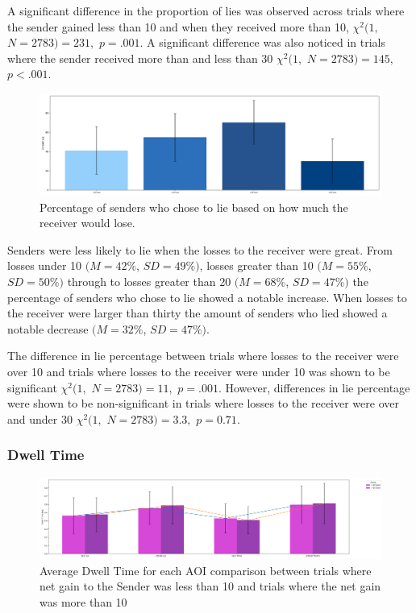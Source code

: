 \documentclass[man, floatsintext]{apa7}
\begin{document}
A significant difference in the proportion of lies was observed across trials where the sender gained less than 10 and when they received more than 10, $\chi^2(1,$ $N=2783) = 231,$ $p=.001$. A significant difference was also noticed in trials where the sender received more than and less than 30 $\chi^2(1,$ $N=2783) = 145,$ $p<.001$.

\begin{figure}[H]
	\includegraphics[width=\linewidth]{../plots/RESPONSE/NetLossLie.png}
	\caption{Percentage of senders who chose to lie based on how much the receiver would lose.}
	\label{fig:NetLossLie}
\end{figure}

Senders were less likely to lie when the losses to the receiver were great. From losses under 10 $(M = 42\%$, $SD = 49\%)$, losses greater than 10 $(M = 55\%$, $SD = 50\%)$ through to losses greater than 20 $(M = 68\%$, $SD = 47\%)$ the percentage of senders who chose to lie showed a notable increase. When losses to the receiver were larger than thirty the amount of senders who lied showed a notable decrease $(M = 32\%$, $SD = 47\%)$. 

The difference in lie percentage between trials where losses to the receiver were over 10 and trials where losses to the receiver were under 10 was shown to be significant $\chi^2(1,$ $N=2783) = 11,$ $p=.001$. However, differences in lie percentage were shown to be non-significant in trials where losses to the receiver were over and under 30 $\chi^2(1,$ $N=2783) = 3.3,$ $p=0.71$.

\subsubsection{Dwell Time}

\begin{figure}[H]
	\includegraphics[width=\linewidth]{../plots/RESPONSE/AvgDwellPerGain.png}
	\caption{Average Dwell Time for each AOI comparison between trials where net gain to the Sender was less than 10 and trials where the net gain was more than 10}
	\label{fig:AvgDwellPerGain}
\end{figure}
\end{document}
